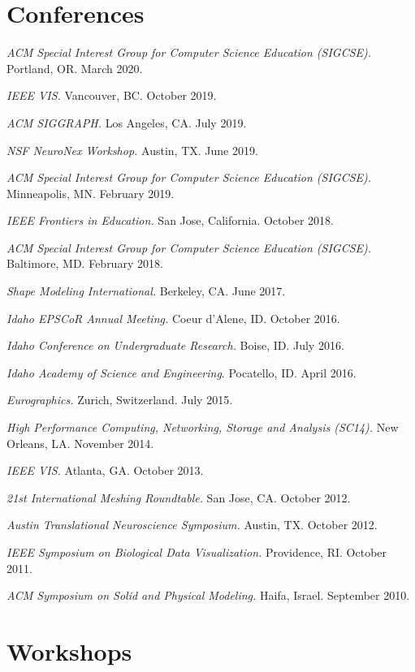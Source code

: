 \documentclass[margin,line]{res}
\begin{document}
\begin{resume}
\begin{LONG}

\end{LONG}

\section{\sc Conferences}
\textit{ACM Special Interest Group for Computer Science Education (SIGCSE).} Portland, OR. March 2020.

\textit{IEEE VIS.} Vancouver, BC. October 2019.

\textit{ACM SIGGRAPH.} Los Angeles, CA. July 2019.

\textit{NSF NeuroNex Workshop.} Austin, TX. June 2019.

\textit{ACM Special Interest Group for Computer Science Education (SIGCSE).} Minneapolis, MN. February 2019.

\textit{IEEE Frontiers in Education.} San Jose, California. October 2018.

\textit{ACM Special Interest Group for Computer Science Education (SIGCSE).} Baltimore, MD. February 2018.

\textit{Shape Modeling International.} Berkeley, CA. June 2017.

\textit{Idaho EPSCoR Annual Meeting.} Coeur d'Alene, ID. October 2016.

\textit{Idaho Conference on Undergraduate Research.} Boise, ID. July 2016.

\textit{Idaho Academy of Science and Engineering}. Pocatello, ID. April 2016.

\textit{Eurographics.} Zurich, Switzerland. July 2015.

\textit{High Performance Computing, Networking, Storage and Analysis (SC14).} New Orleans, LA. November 2014.

\textit{{IEEE VIS}.} Atlanta, GA. October 2013.

\textit{21st International Meshing Roundtable.} San Jose, CA. October 2012.

\textit{Austin Translational Neuroscience Symposium.} Austin, TX. October 2012.

\textit{IEEE Symposium on Biological Data Visualization.} Providence, RI. October 2011.

\textit{ACM Symposium on Solid and Physical Modeling.} Haifa, Israel. September 2010.

\section{\sc Workshops}


\end{resume}
\end{document}
